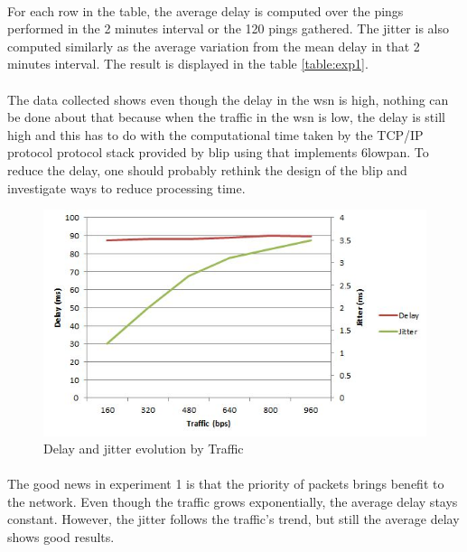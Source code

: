 \documentclass[oneside,12pt,a4paper,final]{book}
\begin{document}
\paragraph{}
For each row in the table, the average delay is computed over the pings performed in the 2 minutes interval or the 120 pings gathered. The jitter is also computed similarly as the average variation from the mean delay in that 2 minutes interval. The result is displayed in the table \ref{table:exp1}. 
\paragraph{}
The data collected shows even though the delay in the \gls{wsn} is high, 
 nothing can be done about that because when the traffic in the \gls{wsn} is low, the delay is still high and this has to do with the computational time taken by the TCP/IP protocol protocol stack provided by \gls{blip} using that implements \gls{6lowpan}. To reduce the delay, one should probably rethink the design of the \gls{blip} and investigate ways to reduce processing time.
 
 \begin{figure}[htbp]
 \centering
 \includegraphics[scale=1]{img/delay_jitter.JPG}
 \caption{Delay and jitter evolution by Traffic}
 \label{fig:delay_jitter}
 \end{figure}
 
 \paragraph{}
 The good news in experiment 1 is that the priority of packets brings benefit to the network. Even though the traffic grows exponentially, the average delay stays constant. However, the jitter follows the traffic's trend, but still the average delay shows good results. 
\end{document}

